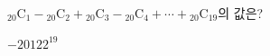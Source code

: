 ${}_{20}\mathrm{C}_1-{}_{20}\mathrm{C}_2+{}_{20}\mathrm{C}_3-{}_{20}\mathrm{C}_4+\cdots+{}_{20}\mathrm{C}_{19}$의 값은?
\begin{choices32}{$-2$}{$0$}{$1$}{$2$}{$2^{19}$}\end{choices32}
